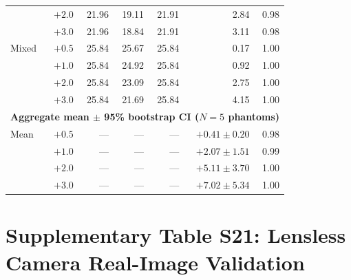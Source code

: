 \documentclass[11pt]{article}
\begin{document}
\begin{table}[htbp]
\begin{tabular}{l r r r r r r}
             & $+2.0$ & 21.96 & 19.11 & 21.91 &  2.84 & 0.98 \\
             & $+3.0$ & 21.96 & 18.84 & 21.91 &  3.11 & 0.98 \\
Mixed        & $+0.5$ & 25.84 & 25.67 & 25.84 &  0.17 & 1.00 \\
             & $+1.0$ & 25.84 & 24.92 & 25.84 &  0.92 & 1.00 \\
             & $+2.0$ & 25.84 & 23.09 & 25.84 &  2.75 & 1.00 \\
             & $+3.0$ & 25.84 & 21.69 & 25.84 &  4.15 & 1.00 \\
\midrule
\multicolumn{7}{l}{\textbf{Aggregate mean $\pm$ 95\% bootstrap CI ($N{=}5$ phantoms)}} \\
\midrule
Mean & $+0.5$ & --- & --- & --- & $+0.41 \pm 0.20$ & 0.98 \\
     & $+1.0$ & --- & --- & --- & $+2.07 \pm 1.51$ & 0.99 \\
     & $+2.0$ & --- & --- & --- & $+5.11 \pm 3.70$ & 1.00 \\
     & $+3.0$ & --- & --- & --- & $+7.02 \pm 5.34$ & 1.00 \\
\bottomrule
\end{tabular}
\end{table}



\section{Supplementary Table S21: Lensless Camera Real-Image Validation}
\label{sec:lensless_real}
\end{document}
